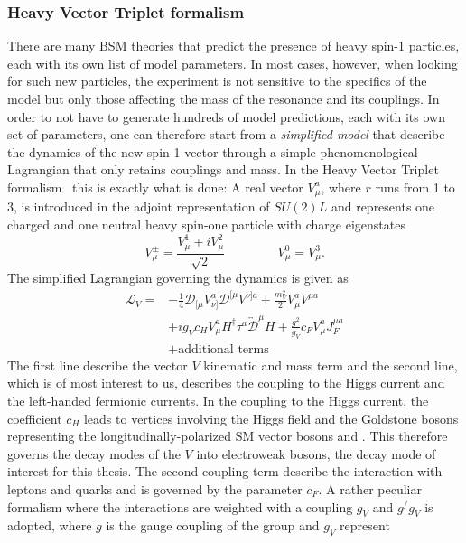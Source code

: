 \subsubsection{Heavy Vector Triplet formalism}
\label{sec:theory:hvt}
There are many BSM theories that predict the presence of heavy spin-1 particles, each with its own list of model parameters. In most cases, however, when looking for such new particles, the experiment is not sensitive to the specifics of the model but only those affecting the mass of the resonance and its couplings. In order to not have to generate hundreds of model predictions, each with its own set of parameters, one can therefore start from a \emph{simplified model} that describe the dynamics of the new spin-1 vector through a simple phenomenological Lagrangian that only retains couplings and mass. In the Heavy Vector Triplet formalism~\cite{Pappadopulo:2014qza} this is exactly what is done: A real vector $V_{\mu}^a$, where $r$ runs from 1 to 3, is introduced in the adjoint representation of $SU(2)L$ and represents one charged
and one neutral heavy spin-one particle with charge eigenstates
\begin{equation}\label{eqn:HVT_1}
V^\pm_\mu = \frac{V^1_\mu \mp iV^2_\mu}{\sqrt{2}} \, \qquad\qquad V^0_\mu = V^3_\mu.
\end{equation}
The simplified Lagrangian governing the dynamics is given as
\begin{equation}
\begin{split}
\mathcal{L}_V = & -\frac{1}{4}\mathcal{D}_{[\mu}V^a_{\nu]}\mathcal{D}^{[\mu}V^{\nu]a} + \frac{m^2_V}{2}V^a_\mu V^{\mu a}\\
 & + ig_Vc_HV^a_\mu H^\dag\tau^a\overleftrightarrow{\mathcal{D}}^\mu H + \frac{g^2}{g_V}c_FV^a_\mu J^{\mu a}_F\\
 & + \mbox{additional terms}
 \end{split}
\end{equation}
The first line describe the vector $V$ kinematic and mass term and the second line, which is of most interest to us, describes the coupling to the Higgs current and the left-handed fermionic currents.
In the coupling to the Higgs current, the coefficient $c_H$ leads to vertices involving the Higgs field and the Goldstone bosons representing the longitudinally-polarized SM vector bosons \PW and \PZ.
This therefore governs the decay modes of the $V$ into electroweak bosons, the decay mode of interest for this thesis. The second coupling term describe the interaction with leptons and quarks and is governed by the parameter $c_F$. A rather peculiar formalism where the interactions are weighted with a coupling $g_V$ and $g^/g_V$ is adopted, where $g$ is the gauge coupling of the group and $g_V$ represent
